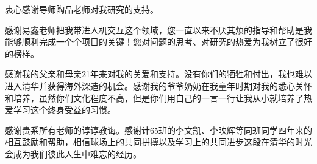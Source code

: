 
\begin{acknowledgements}
  衷心感谢导师陶品老师对我研究的支持。
  
  感谢易鑫老师把我带进人机交互这个领域，您一直以来不厌其烦的指导和帮助是我能够顺利完成一个个项目的关键！您对问题的思考、对研究的热爱为我树立了很好的榜样。

  感谢我的父亲和母亲21年来对我的关爱和支持。没有你们的牺牲和付出，我也难以进入清华并获得海外深造的机会。感谢我的爷爷奶奶在我童年时期对我的悉心关怀和培养，虽然你们文化程度不高，但是你们用自己的一言一行让我从小就培养了热爱学习这个终身受益的习惯。

  感谢贵系所有老师的谆谆教诲。感谢计65班的李文凯、李映辉等同班同学四年来的相互鼓励和帮助，相信球场上的共同拼搏以及学习上的共同进步这段在清华的时光会成为我们彼此人生中难忘的经历。
\end{acknowledgements}
